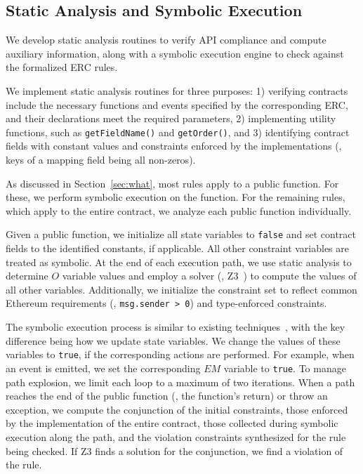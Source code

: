 \subsection{Static Analysis and Symbolic Execution}
\label{sec:se}

We develop static analysis routines to verify API compliance and compute 
auxiliary information, along with a symbolic execution engine
to check against the formalized ERC rules.


We implement static analysis routines for three purposes:
1)	verifying contracts include the necessary functions 
and events specified by the corresponding ERC, 
and their declarations meet the required parameters,
2)	implementing utility functions, 
such as \texttt{getFieldName()} and \texttt{getOrder()},
and 
3)	identifying contract fields with constant values and constraints enforced 
by the implementations (\eg, keys of a mapping field being all non-zeros).


As discussed in Section~\ref{sec:what}, most rules apply to a public function. 
For these, we perform symbolic execution on the function. 
For the remaining rules, which apply to the entire contract, 
we analyze each public function individually.


Given a public function, we initialize all state variables to \texttt{false} 
and set contract fields to the identified constants, if applicable. 
All other constraint variables are treated as symbolic. 
At the end of each execution path, 
we use static analysis to determine $O$ variable values 
and employ a solver (\ie, Z3~\cite{z3-repo}) to compute the values 
of all other variables. Additionally, we initialize the constraint set to 
reflect common Ethereum requirements (\eg, \texttt{msg.sender > 0}) 
and type-enforced constraints. %

The symbolic execution process is similar to existing techniques~\cite{klee,S2E,SymCC}, 
with the key difference being how we update state variables. 
We change the values of these variables to \texttt{true}, 
if the corresponding actions are performed. 
For example, when an event is emitted, we set the corresponding $EM$ variable to \texttt{true}. 
To manage path explosion, we limit each loop to a maximum of two iterations. 
When a path reaches the end of the public function (\ie, the function's return) 
or throw an exception, 
we compute the conjunction of the initial constraints, those enforced by the
implementation of the entire contract,
those collected during symbolic execution along the path, 
and the violation constraints synthesized for the rule being checked. 
If Z3 finds a solution for the conjunction, 
we find a violation of the rule.


